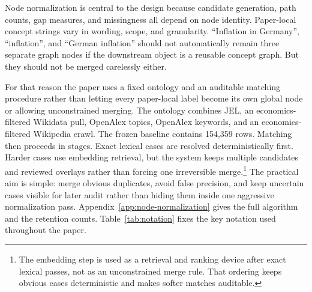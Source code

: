 \documentclass[11pt]{article}
\begin{document}
Node normalization is central to the design because candidate generation, path counts, gap measures, and missingness all depend on node identity. Paper-local concept strings vary in wording, scope, and granularity. ``Inflation in Germany'', ``inflation'', and ``German inflation'' should not automatically remain three separate graph nodes if the downstream object is a reusable concept graph. But they should not be merged carelessly either.

For that reason the paper uses a fixed ontology and an auditable matching procedure rather than letting every paper-local label become its own global node or allowing unconstrained merging. The ontology combines JEL, an economics-filtered Wikidata pull, OpenAlex topics, OpenAlex keywords, and an economics-filtered Wikipedia crawl. The frozen baseline contains 154{,}359 rows. Matching then proceeds in stages. Exact lexical cases are resolved deterministically first. Harder cases use embedding retrieval, but the system keeps multiple candidates and reviewed overlays rather than forcing one irreversible merge.\footnote{The embedding step is used as a retrieval and ranking device after exact lexical passes, not as an unconstrained merge rule. That ordering keeps obvious cases deterministic and makes softer matches auditable.} The practical aim is simple: merge obvious duplicates, avoid false precision, and keep uncertain cases visible for later audit rather than hiding them inside one aggressive normalization pass. Appendix~\ref{app:node-normalization} gives the full algorithm and the retention counts. Table~\ref{tab:notation} fixes the key notation used throughout the paper.
\end{document}
